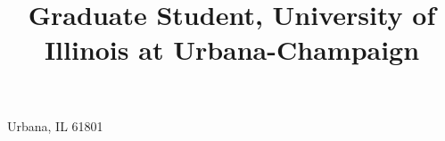 
\usepackage[margin=0.75in]{geometry}

\makeatletter %
\makeatother  %



\setlength{\hintscolumnwidth}{2.3cm}


\title{
    Graduate Student, \texorpdfstring{\newline}{}
    University of Illinois at Urbana-Champaign
}

\address{1617 Melrose Park Ct., Apt.\ 2024}{Urbana, IL 61801}


\usepackage{multibib} %


\makeatletter %
\renewcommand*\bibliographyitemlabel{\@biblabel{\arabic{enumiv}}}
\makeatother  %

